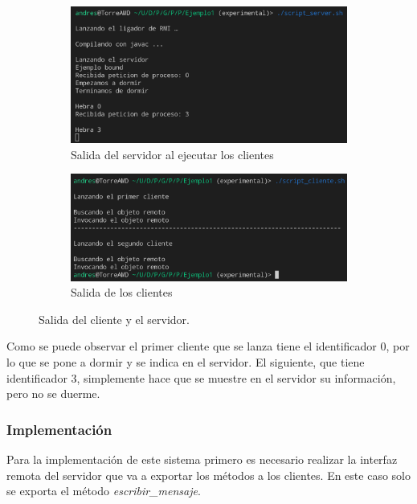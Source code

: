 \documentclass{article}
\begin{document}
\begin{figure}[H]
    \centering
    \begin{subfigure}[H]{0.49\textwidth}
        \centering
        \includegraphics[width=\textwidth]{imagenes/E1S.png}
        \caption{Salida del servidor al ejecutar los clientes}        
    \end{subfigure}
    \hfill
    \begin{subfigure}[H]{0.49\textwidth}
        \centering
        \includegraphics[width=\textwidth]{imagenes/E1C.png}
        \caption{Salida de los clientes}        
    \end{subfigure}
    \caption{Salida del cliente y el servidor.}
\end{figure}

Como se puede observar el primer cliente que se lanza tiene el identificador 0, por lo que se pone a dormir y se indica en el servidor. El siguiente, que tiene identificador 3, simplemente hace que se muestre en el servidor su información, pero no se duerme.

\subsubsection{Implementación}
Para la implementación de este sistema primero es necesario realizar la interfaz remota del servidor que va a exportar los métodos a los clientes. En este caso solo se exporta el método \textit{escribir\_mensaje}.
\end{document}
